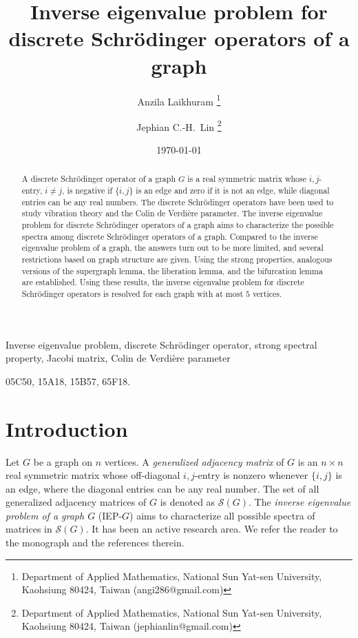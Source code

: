 \documentclass{article}
\title{Inverse eigenvalue problem for discrete Schrödinger operators of a graph}
\author{
Anzila Laikhuram 
\thanks{Department of Applied Mathematics, National Sun Yat-sen University, Kaohsiung 80424, Taiwan (angi286@gmail.com)}
\and
Jephian C.-H.~Lin
\thanks{Department of Applied Mathematics, National Sun Yat-sen University, Kaohsiung 80424, Taiwan (jephianlin@gmail.com)}
}
\date{\today}
\theoremstyle{definition}
\newcommand{\mptn}{\mathcal{S}}
\begin{document}
\maketitle


\begin{abstract}
A discrete Schrödinger operator of a graph $G$ is a real symmetric matrix whose $i,j$-entry, $i \neq j$, is negative if $\{i,j\}$ is an edge and zero if it is not an edge, while diagonal entries can be any real numbers.  The discrete Schrödinger operators have been used to study vibration theory and the Colin de Verdi\`ere parameter.  The inverse eigenvalue problem for discrete Schr\"odinger operators of a graph aims to characterize the possible spectra among discrete Schrödinger operators of a graph. Compared to the inverse eigenvalue problem of a graph, the answers turn out to be more limited, and several restrictions based on graph structure are given.  Using the strong properties, analogous versions of the supergraph lemma, the liberation lemma, and the bifurcation lemma are established.  Using these results, the inverse eigenvalue problem for discrete Schr\"odinger operators is resolved for each graph with at most $5$ vertices.
\end{abstract}  

Inverse eigenvalue problem, discrete Schrödinger operator, strong spectral property, Jacobi matrix, Colin de Verdi\`ere parameter

\medskip

05C50, %
15A18, %
15B57, %
65F18. %

\section{Introduction}

Let $G$ be a graph on $n$ vertices.  A \emph{generalized adjacency matrix} of $G$ is an $n\times n$ real symmetric matrix whose off-diagonal $i,j$-entry is nonzero whenever $\{i,j\}$ is an edge, where the diagonal entries can be any real number.  The set of all generalized adjacency matrices of $G$ is denoted as $\mptn(G)$.  The \emph{inverse eigenvalue problem of a graph $G$} (IEP-$G$) aims to characterize all possible spectra of matrices in $\mptn(G)$.  It has been an active research area.  We refer the reader to the monograph \cite{IEPGZF22} and the references therein.
\end{document}
